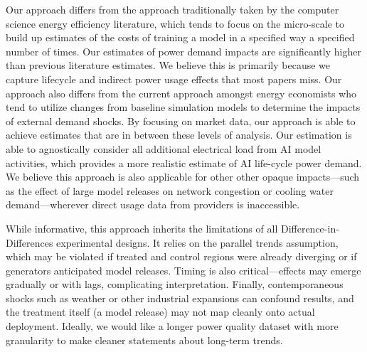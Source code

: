 \documentclass[sigconf]{acmart}
\begin{document}
Our approach differs from the approach traditionally taken by the computer science energy efficiency literature, which tends to focus on the micro-scale to build up estimates of the costs of training a model in a specified way a specified number of times. Our estimates of power demand impacts are significantly higher than previous literature estimates. We believe this is primarily because we capture lifecycle and indirect power usage effects that most papers miss. Our approach also differs from the current approach amongst energy economists who tend to utilize changes from baseline simulation models to determine the impacts of external demand shocks. By focusing on market data, our approach is able to achieve estimates that are in between these levels of analysis. Our estimation is able to agnostically consider all additional electrical load from AI model activities, which provides a more realistic estimate of AI life-cycle power demand. We believe this approach is also applicable for other other opaque impacts—such as the effect of large model releases on network congestion or cooling water demand—wherever direct usage data from providers is inaccessible.




While informative, this approach inherits the limitations of all Difference-in-Differences experimental designs. It relies on the parallel trends assumption, which may be violated if treated and control regions were already diverging or if generators anticipated model releases. %
Timing is also critical—effects may emerge gradually or with lags, complicating interpretation. Finally, contemporaneous shocks such as weather or other industrial expansions can confound results, and the treatment itself (a model release) may not map cleanly onto actual deployment. Ideally, we would like a longer power quality dataset with more granularity to make cleaner statements about long-term trends.
\end{document}
